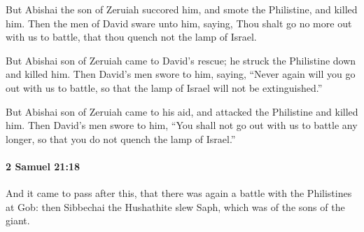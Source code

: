 			\begin{versebox}
					\item[BHS] 
					\item[ASV] But Abishai the son of Zeruiah succored him, and smote the Philistine, and killed him. Then the men of David sware unto him, saying, Thou shalt go no more out with us to battle, that thou quench not the lamp of Israel.
					\item[NIV] But Abishai son of Zeruiah came to David’s rescue; he struck the Philistine down and killed him. Then David’s men swore to him, saying, “Never again will you go out with us to battle, so that the lamp of Israel will not be extinguished.”
					\item[NRSV] But Abishai son of Zeruiah came to his aid, and attacked the Philistine and killed him. Then David’s men swore to him, “You shall not go out with us to battle any longer, so that you do not quench the lamp of Israel.”
			\end{versebox}

		\paragraph{2 Samuel 21:18} %
			\label{2SAMUEL-21-18}

			And it came to pass after this, that there was again a battle with the Philistines at Gob: then Sibbechai the Hushathite slew Saph, which was of the sons of the giant.

